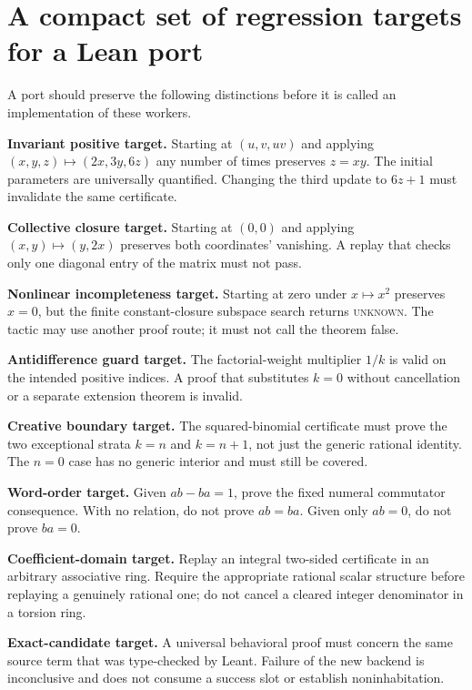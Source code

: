 \documentclass[11pt,letterpaper]{article}
\newcommand{\unknown}{\textsc{unknown}}
\theoremstyle{definition}\newtheorem{definition}[theorem]{Definition}
\theoremstyle{remark}\newtheorem{remark}[theorem]{Remark}
\begin{document}
\section{A compact set of regression targets for a Lean port}
\label{app:targets}
A port should preserve the following distinctions before it is called an
implementation of these workers.

\textbf{Invariant positive target.} Starting at $(u,v,uv)$ and applying
$(x,y,z)\mapsto(2x,3y,6z)$ any number of times preserves $z=xy$.
The initial parameters are universally quantified. Changing the third update
to $6z+1$ must invalidate the same certificate.

\textbf{Collective closure target.} Starting at $(0,0)$ and applying
$(x,y)\mapsto(y,2x)$ preserves both coordinates' vanishing. A replay that checks
only one diagonal entry of the matrix must not pass.

\textbf{Nonlinear incompleteness target.} Starting at zero under $x\mapsto x^2$
preserves $x=0$, but the finite constant-closure subspace search returns
\unknown{}. The tactic may use another proof route; it must not call the
theorem false.

\textbf{Antidifference guard target.} The factorial-weight multiplier $1/k$
is valid on the intended positive indices. A proof that substitutes $k=0$
without cancellation or a separate extension theorem is invalid.

\textbf{Creative boundary target.} The squared-binomial certificate must prove
the two exceptional strata $k=n$ and $k=n+1$, not just the generic rational
identity. The $n=0$ case has no generic interior and must still be covered.

\textbf{Word-order target.} Given $ab-ba=1$, prove the fixed numeral
commutator consequence. With no relation, do not prove $ab=ba$. Given only
$ab=0$, do not prove $ba=0$.

\textbf{Coefficient-domain target.} Replay an integral two-sided certificate
in an arbitrary associative ring. Require the appropriate rational scalar
structure before replaying a genuinely rational one; do not cancel a cleared
integer denominator in a torsion ring.

\textbf{Exact-candidate target.} A universal behavioral proof must concern the
same source term that was type-checked by Leant. Failure of the new backend is
inconclusive and does not consume a success slot or establish noninhabitation.
\end{document}
